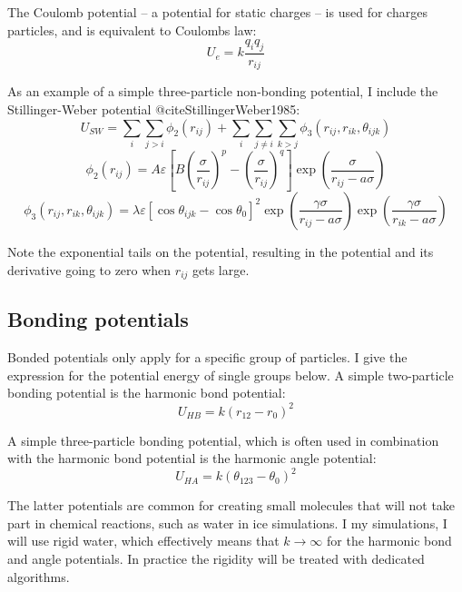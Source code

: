 The Coulomb potential -- a potential for static charges -- is used for charges particles, and is equivalent to Coulombs law:
\begin{equation}
	U_e = k\frac{q_iq_j}{r_{ij}}
\end{equation}

As an example of a simple three-particle non-bonding potential, I include the Stillinger-Weber potential @citeStillingerWeber1985:
\begin{equation}
	U_{SW} = \sum_i \sum_{j>i} \phi_2(r_{ij}) + \sum_i \sum_{j\neq i} \sum_{k>j} \phi_3(r_{ij}, r_{ik}, \theta_{ijk})
\end{equation}
\begin{equation}
	\phi_2(r_{ij}) = A\varepsilon\left[ B \left( \frac{\sigma}{r_{ij}}\right)^p-\left(\frac{\sigma}{r_{ij}}\right)^q\right]\exp\left(\frac{\sigma}{r_{ij}-a\sigma}\right)
\end{equation}
\begin{equation}
	\phi_3(r_{ij}, r_{ik}, \theta_{ijk}) = \lambda\varepsilon\left[ \cos{\theta_{ijk}} - \cos{\theta_0}\right]^2 \exp\left( \frac{\gamma\sigma}{r_{ij}-a\sigma}\right) \exp\left(\frac{\gamma \sigma}{r_{ik}-a\sigma} \right)
\end{equation}

Note the exponential tails on the potential, resulting in the potential and its derivative going to zero when $r_{ij}$ gets large.

\subsection{Bonding potentials}
Bonded potentials only apply for a specific group of particles. I give the expression for the potential energy of single groups below.
A simple two-particle bonding potential is the harmonic bond potential:
\begin{equation}
	U_{HB} = k(r_{12} - r_0)^2
\end{equation}

A simple three-particle bonding potential, which is often used in combination with the harmonic bond potential is the harmonic angle potential:
\begin{equation}
	U_{HA} = k(\theta_{123} - \theta_0)^2
\end{equation}

The latter potentials are common for creating small molecules that will not take part in chemical reactions, such as water in ice simulations. I my simulations, I will use rigid water, which effectively means that $k\to\infty$ for the harmonic bond and angle potentials. In practice the rigidity will be treated with dedicated algorithms.

